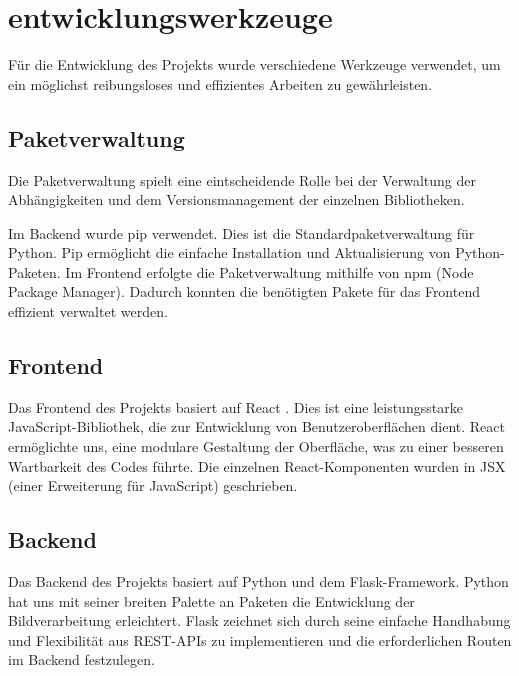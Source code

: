 \section{entwicklungswerkzeuge}
Für die Entwicklung des Projekts wurde verschiedene Werkzeuge verwendet, um ein möglichst reibungsloses und effizientes Arbeiten zu gewährleisten.

\subsection{Paketverwaltung}
Die Paketverwaltung spielt eine eintscheidende Rolle bei der Verwaltung der Abhängigkeiten und dem Versionsmanagement der einzelnen Bibliotheken.

Im Backend wurde \glqq{}pip\grqq{} verwendet. Dies ist die Standardpaketverwaltung für Python. \glqq{}Pip\grqq{} ermöglicht die einfache Installation und Aktualisierung von Python-Paketen. Im Frontend erfolgte die Paketverwaltung mithilfe von  \glqq{}npm\grqq{} (Node Package Manager). Dadurch konnten die benötigten Pakete für das Frontend effizient verwaltet werden.

\subsection{Frontend}
Das Frontend des Projekts basiert auf React \cite{react}. Dies ist eine leistungsstarke JavaScript-Bibliothek, die zur Entwicklung von Benutzeroberflächen dient. React ermöglichte uns, eine modulare Gestaltung der Oberfläche, was zu einer besseren Wartbarkeit des Codes führte. Die einzelnen React-Komponenten wurden in JSX (einer Erweiterung für JavaScript) geschrieben. 

\subsection{Backend}
Das Backend des Projekts basiert auf Python und dem Flask-Framework. Python hat uns mit seiner breiten Palette an Paketen die Entwicklung der Bildverarbeitung erleichtert. Flask zeichnet sich durch seine einfache Handhabung und Flexibilität aus REST-APIs zu implementieren und die erforderlichen Routen im Backend festzulegen.